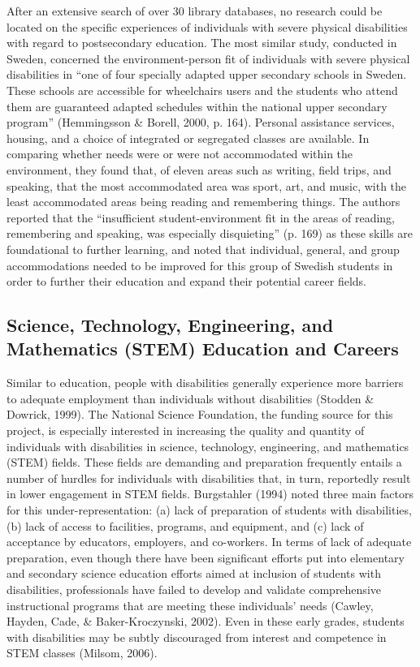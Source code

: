 \documentclass[11.5pt]{sig-alternate} %
\begin{document}
\begin{large}
After an extensive search of over 30 library databases, no research could be located on the specific experiences of individuals with severe physical disabilities with regard to postsecondary education. The most similar study, conducted in Sweden, concerned the environment-person fit of individuals with severe physical disabilities in “one of four specially adapted upper secondary schools in Sweden. These schools are accessible for wheelchairs users and the students who attend them are guaranteed adapted schedules within the national upper secondary program” (Hemmingsson \& Borell, 2000, p. 164). Personal assistance services, housing, and a choice of integrated or segregated classes are available. In comparing whether needs were or were not accommodated within the environment, they found that, of eleven areas such as writing, field trips, and speaking, that the most accommodated area was sport, art, and music, with the least accommodated areas being reading and remembering things. The authors reported that the “insufficient student-environment fit in the areas of reading, remembering and speaking, was especially disquieting” (p. 169) as these skills are foundational to further learning, and noted that individual, general, and group accommodations needed to be improved for this group of Swedish students in order to further their education and expand their potential career fields. 

\subsection*{Science, Technology, Engineering, and Mathematics (STEM) Education and Careers}
Similar to education, people with disabilities generally experience more barriers to adequate employment than individuals without disabilities (Stodden \& Dowrick, 1999). The National Science Foundation, the funding source for this project, is especially interested in increasing the quality and quantity of individuals with disabilities in science, technology, engineering, and mathematics (STEM) fields. These fields are demanding and preparation frequently entails a number of hurdles for individuals with disabilities that, in turn, reportedly result in lower engagement in STEM fields. Burgstahler (1994) noted three main factors for this under-representation: (a) lack of preparation of students with disabilities, (b) lack of access to facilities, programs, and equipment, and (c) lack of acceptance by educators, employers, and co-workers. In terms of lack of adequate preparation, even though there have been significant efforts put into elementary and secondary science education efforts aimed at inclusion of students with disabilities, professionals have failed to develop and validate comprehensive instructional programs that are meeting these individuals' needs (Cawley, Hayden, Cade, \& Baker-Kroczynski, 2002). Even in these early grades, students with disabilities may be subtly discouraged from interest and competence in STEM classes (Milsom, 2006).


\end{large}
\end{document}
